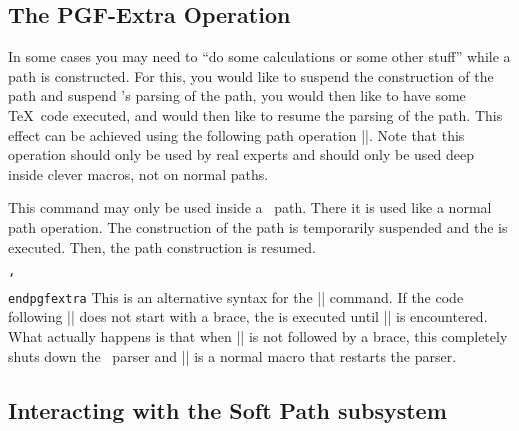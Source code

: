 \subsection{The PGF-Extra Operation}

In some cases you may need to ``do some calculations or some other stuff''
while a path is constructed. For this, you would like to suspend the
construction of the path and suspend \tikzname's parsing of the path, you would
then like to have some \TeX\ code executed, and would then like to resume the
parsing of the path. This effect can be achieved using the following path
operation |\pgfextra|. Note that this operation should only be used by real
experts and should only be used deep inside clever macros, not on normal paths.

\begin{command}{\pgfextra{}}
    This command may only be used inside a \tikzname\ path. There it is used
    like a normal path operation. The construction of the path is temporarily
    suspended and the  is executed. Then, the path construction is
    resumed.
\begin{codeexample}[]
\newdimen\mydim
\begin{tikzpicture}
  \mydim=1cm
  \draw (0pt,\mydim) \pgfextra{\mydim=2cm} -- (0pt,\mydim);
\end{tikzpicture}
\end{codeexample}
\end{command}

\begin{command}{\pgfextra {} \texttt{\char`\\endpgfextra}}
    This is an alternative syntax for the |\pgfextra| command. If the code
    following |\pgfextra| does not start with a brace, the  is
    executed until |\endpgfextra| is encountered. What actually happens is that
    when |\pgfextra| is not followed by a brace, this completely shuts down the
    \tikzname\ parser and |\endpgfextra| is a normal macro that restarts the
    parser.
\begin{codeexample}[]
\newdimen\mydim
\begin{tikzpicture}
  \mydim=1cm
  \draw (0pt,\mydim)
    \pgfextra \mydim=2cm \endpgfextra -- (0pt,\mydim);
\end{tikzpicture}
\end{codeexample}
\end{command}


\subsection{Interacting with the Soft Path subsystem}

